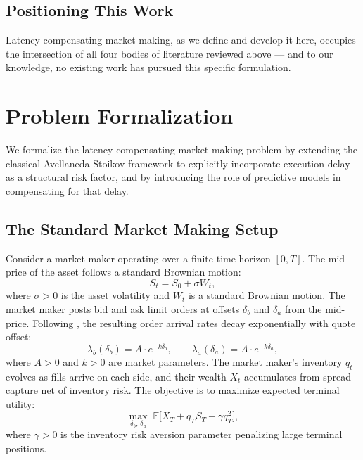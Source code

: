 \documentclass[12pt]{article}
\begin{document}
\subsection{Positioning This Work}

Latency-compensating market making, as we define and develop it here, occupies the intersection of all four bodies of literature reviewed above --- and to our knowledge, no existing work has pursued this specific formulation.

\section{Problem Formalization}
\label{sec:formalization}

We formalize the latency-compensating market making problem by extending the classical Avellaneda-Stoikov framework to explicitly incorporate execution delay as a structural risk factor, and by introducing the role of predictive models in compensating for that delay.

\subsection{The Standard Market Making Setup}

Consider a market maker operating over a finite time horizon $[0, T]$. The mid-price of the asset follows a standard Brownian motion:
\begin{equation}
  S_t = S_0 + \sigma W_t,
\end{equation}
where $\sigma > 0$ is the asset volatility and $W_t$ is a standard Brownian motion. The market maker posts bid and ask limit orders at offsets $\delta_b$ and $\delta_a$ from the mid-price. Following \citet{avellaneda2008}, the resulting order arrival rates decay exponentially with quote offset:
\begin{equation}
  \lambda_b(\delta_b) = A \cdot e^{-k\delta_b}, \qquad
  \lambda_a(\delta_a) = A \cdot e^{-k\delta_a},
\end{equation}
where $A > 0$ and $k > 0$ are market parameters. The market maker's inventory $q_t$ evolves as fills arrive on each side, and their wealth $X_t$ accumulates from spread capture net of inventory risk. The objective is to maximize expected terminal utility:
\begin{equation}
  \max_{\delta_b,\, \delta_a} \;\mathbb{E}\bigl[X_T + q_T S_T - \gamma q_T^2\bigr],
\end{equation}
where $\gamma > 0$ is the inventory risk aversion parameter penalizing large terminal positions.
\end{document}
